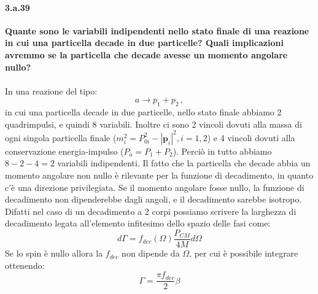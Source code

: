 \documentclass[twoside]{article}
\begin{document}
\paragraph{3.a.39}\textbf{Quante sono le variabili indipendenti nello stato finale di una reazione in cui una particella decade in due particelle? Quali implicazioni avremmo se la particella che decade avesse un momento angolare nullo?}\\\\
In una reazione del tipo:
\begin{equation}
a \longrightarrow p_1+p_2 \, ,
\end{equation}
in cui una particella decade in due particelle, nello stato finale abbiamo 2 quadrimpulsi, e quindi 8 variabili. Inoltre ci sono 2 vincoli dovuti alla massa di ogni singola particella finale ($m_i^2=P_{0i}^2-|\mathbf{p}_i|^2, i=1,2$) e 4 vincoli dovuti alla conservazione energia-impulso ($P_a=P_1+P_2$). Perciò in tutto abbiamo $8-2-4=2$ variabili indipendenti. Il fatto che la particella che decade abbia un momento angolare non nullo è rilevante per la funzione di decadimento, in quanto c'è una direzione privilegiata. Se il momento angolare fosse nullo, la funzione di decadimento non dipenderebbe dagli angoli, e il decadimento sarebbe isotropo.
Difatti nel caso di un decadimento a 2 corpi possiamo scrivere la larghezza di decadimento legata all'elemento infitesimo dello spazio delle fasi come:
\begin{equation}
    d\Gamma=f_{dec}(\Omega)\frac{P_{CM}}{4M}d\Omega
\end{equation}
Se lo spin è nullo allora la $f_{dec}$ non dipende da $\Omega$, per cui è possibile integrare ottenendo:
\begin{equation}
    \Gamma=\frac{\pi f_{dec}}{2}\beta
\end{equation}
\end{document}
